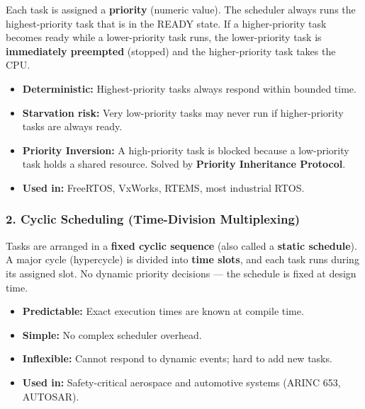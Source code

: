 \documentclass[12pt,a4paper]{article}
\begin{document}
\begin{tcolorbox}[defbox, title={\textbf{Priority-Based Preemptive Scheduling}}]
Each task is assigned a \textbf{priority} (numeric value). The scheduler always runs the highest-priority task that is in the READY state. If a higher-priority task becomes ready while a lower-priority task runs, the lower-priority task is \textbf{immediately preempted} (stopped) and the higher-priority task takes the CPU.
\end{tcolorbox}

\begin{itemize}[leftmargin=*, itemsep=3pt]
  \item \textbf{Deterministic:} Highest-priority tasks always respond within bounded time.
  \item \textbf{Starvation risk:} Very low-priority tasks may never run if higher-priority tasks are always ready.
  \item \textbf{Priority Inversion:} A high-priority task is blocked because a low-priority task holds a shared resource. Solved by \textbf{Priority Inheritance Protocol}.
  \item \textbf{Used in:} FreeRTOS, VxWorks, RTEMS, most industrial RTOS.
\end{itemize}

\subsubsection*{2. Cyclic Scheduling (Time-Division Multiplexing)}

\begin{tcolorbox}[defbox, title={\textbf{Cyclic Scheduling}}]
Tasks are arranged in a \textbf{fixed cyclic sequence} (also called a \textbf{static schedule}). A major cycle (hypercycle) is divided into \textbf{time slots}, and each task runs during its assigned slot. No dynamic priority decisions --- the schedule is fixed at design time.
\end{tcolorbox}

\begin{itemize}[leftmargin=*, itemsep=3pt]
  \item \textbf{Predictable:} Exact execution times are known at compile time.
  \item \textbf{Simple:} No complex scheduler overhead.
  \item \textbf{Inflexible:} Cannot respond to dynamic events; hard to add new tasks.
  \item \textbf{Used in:} Safety-critical aerospace and automotive systems (ARINC 653, AUTOSAR).
\end{itemize}
\end{document}
